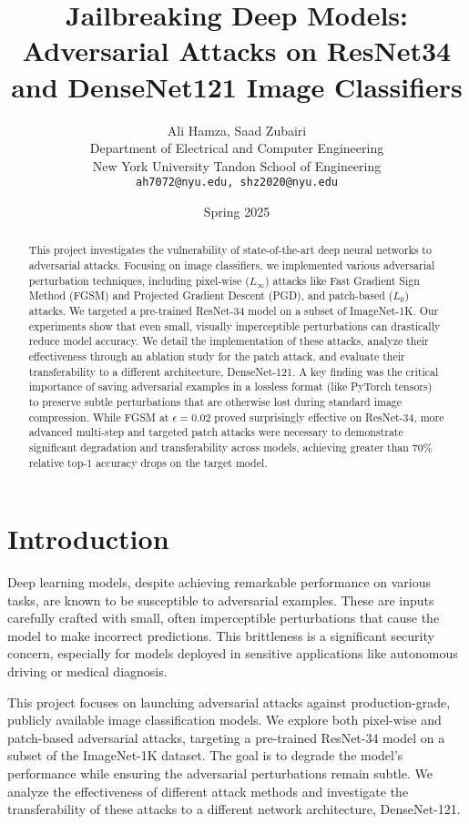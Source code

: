 \documentclass[letterpaper]{article}
\title{Jailbreaking Deep Models: Adversarial Attacks on ResNet34 and DenseNet121 Image Classifiers}
\author{Ali Hamza, Saad Zubairi \\
Department of Electrical and Computer Engineering\\
New York University Tandon School of Engineering\\
\texttt{ah7072@nyu.edu, shz2020@nyu.edu}\\%
}
\date{Spring 2025} %
\begin{document}
\maketitle

\begin{abstract}
This project investigates the vulnerability of state-of-the-art deep neural networks to adversarial attacks. Focusing on image classifiers, we implemented various adversarial perturbation techniques, including pixel-wise ($L_\infty$) attacks like Fast Gradient Sign Method (FGSM) and Projected Gradient Descent (PGD), and patch-based ($L_0$) attacks. We targeted a pre-trained ResNet-34 model on a subset of ImageNet-1K. Our experiments show that even small, visually imperceptible perturbations can drastically reduce model accuracy. We detail the implementation of these attacks, analyze their effectiveness through an ablation study for the patch attack, and evaluate their transferability to a different architecture, DenseNet-121. A key finding was the critical importance of saving adversarial examples in a lossless format (like PyTorch tensors) to preserve subtle perturbations that are otherwise lost during standard image compression. While FGSM at $\epsilon=0.02$ proved surprisingly effective on ResNet-34, more advanced multi-step and targeted patch attacks were necessary to demonstrate significant degradation and transferability across models, achieving greater than 70\% relative top-1 accuracy drops on the target model.
\end{abstract}


\section{Introduction}
Deep learning models, despite achieving remarkable performance on various tasks, are known to be susceptible to adversarial examples. These are inputs carefully crafted with small, often imperceptible perturbations that cause the model to make incorrect predictions. This brittleness is a significant security concern, especially for models deployed in sensitive applications like autonomous driving or medical diagnosis.

This project focuses on launching adversarial attacks against production-grade, publicly available image classification models. We explore both pixel-wise and patch-based adversarial attacks, targeting a pre-trained ResNet-34 model on a subset of the ImageNet-1K dataset. The goal is to degrade the model's performance while ensuring the adversarial perturbations remain subtle. We analyze the effectiveness of different attack methods and investigate the transferability of these attacks to a different network architecture, DenseNet-121.
\end{document}
